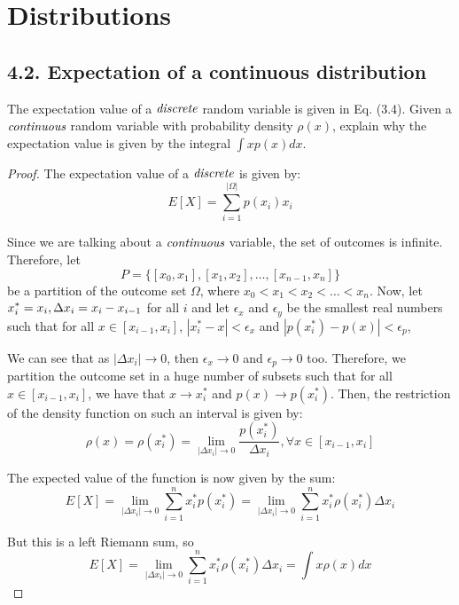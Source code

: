 \chapter{Distributions}

\section*{4.2. Expectation of a continuous distribution}
The expectation value of a $\emph{discrete}$ random variable is 
given in Eq. (3.4). Given a $\emph{continuous}$ random variable with
probability density  $\rho(x)$, explain why the expectation value is
given by the integral $\int{xp(x)}dx$.

\vspace{1em}

\begin{proof}
    The expectation value of a $\emph{discrete}$ is given by:
    \begin{equation*}\tag{3.4}
        E[X] = \sum_{i = 1}^{|\Omega|}p(x_i) x_i
    \end{equation*}

    Since we are talking about a $\emph{continuous}$ variable, 
    the set of outcomes is infinite. Therefore, let 
    \[
        P = \{[x_0, x_1], [x_1, x_2], \ldots, [x_{n - 1}, x_n]\}
    \]
    be a partition of the outcome set $\Omega$, where $x_0 < x_1 < x_2 < \ldots < x_n$. Now, let
    $\displaystyle x_i^* = x_i, \linebreak \Delta x_i = x_i - x_{i-1}$ for all $i$ and 
    let $\epsilon_x$ and $\epsilon_y$ be the smallest real numbers such that for 
    all $x \in [x_{i - 1}, x_i]$, $|x_i^* - x| < \epsilon_x$ and $|p(x_i^*) - p(x)| < \epsilon_p$, 

    We can see that as $|\Delta x_i| \to 0$, then  $\epsilon_x \to 0$ and $\epsilon_p \to 0$ too.
    Therefore, we partition the outcome set in a huge number of subsets
    such that for all $x \in [x_{i - 1}, x_i]$, we have that $x \to x_i^*$
    and $p(x) \to p(x_i^*)$. Then, the restriction of the density function 
    on such an interval is given by:
    \[
        \rho(x) = \rho(x_i^*) = \lim_{|\Delta x_i| \to 0} \frac{p(x_i^*)}{\Delta x_i}, 
        \forall x \in [x_{i - 1}, x_i]
    \] 

    The expected value of the function is now given by the sum:
    \[
        E[X] = \lim_{|\Delta x_i| \to 0}\sum_{i = 1}^{n} x_i^* p(x_i^*)
        = \lim_{|\Delta x_i| \to 0}\sum_{i = 1}^{n} x_i^* \rho(x_i^*) \Delta x_i
    \] 

    But this is a left Riemann sum, so
    \[
        E[X] = \lim_{|\Delta x_i| \to 0}\sum_{i = 1}^{n} x_i^* \rho(x_i^*) \Delta x_i
        = \int x\rho(x) dx
    \] 
\end{proof}

